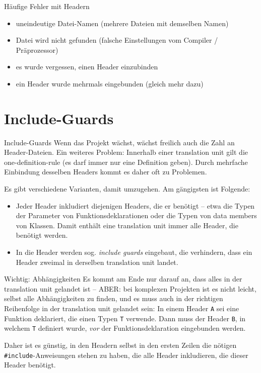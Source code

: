\begin{frame}{Häufige Fehler mit Headern}
	\begin{itemize}
		\item uneindeutige Datei-Namen (mehrere Dateien mit demselben Namen)
		\item Datei wird nicht gefunden (falsche Einstellungen vom Compiler / Präprozessor)
		\item es wurde vergessen, einen Header einzubinden
		\item ein Header wurde mehrmals eingebunden (gleich mehr dazu)
	\end{itemize}
\end{frame}


\section{Include-Guards}

\begin{frame}{Include-Guards}
	Wenn das Projekt wächst, wächst freilich auch die Zahl an Header-Dateien. Ein weiteres Problem: Innerhalb einer translation unit gilt die one-definition-rule (es darf immer nur eine Definition geben). Durch mehrfache Einbindung desselben Headers kommt es daher oft zu Problemen.
	
	\pause
	\vspace{1em}
	
	Es gibt verschiedene Varianten, damit umzugehen. Am gängigsten ist Folgende:
	\begin{itemize}
		\item Jeder Header inkludiert diejenigen Headers, die er benötigt -- etwa die Typen der Parameter von Funktionsdeklarationen oder die Typen von data members von Klassen. Damit enthält eine translation unit immer alle Header, die benötigt werden.
		\item In die Header werden sog. \emph{include guards} eingebaut, die verhindern, dass ein Header zweimal in derselben translation unit landet.
	\end{itemize}
\end{frame}

\begin{frame}[fragile]{Wichtig: Abhängigkeiten}
	Es kommt am Ende nur darauf an, dass alles in der translation unit gelandet ist -- ABER: bei komplexen Projekten ist es nicht leicht, selbst alle Abhängigkeiten zu finden, und es muss auch in der richtigen Reihenfolge in der translation unit gelandet sein: In einem Header \verb|A| sei eine Funktion deklariert, die einen Typen \verb|T| verwende. Dann muss der Header \verb|B|, in welchem \verb|T| definiert wurde, \emph{vor} der Funktionsdeklaration eingebunden werden.
	
	\pause
	\vspace{1em}
	
	Daher ist es günstig, in den Headern selbst in den ersten Zeilen die nötigen \verb|#include|-Anweisungen stehen zu haben, die alle Header inkludieren, die dieser Header benötigt.
\end{frame}

